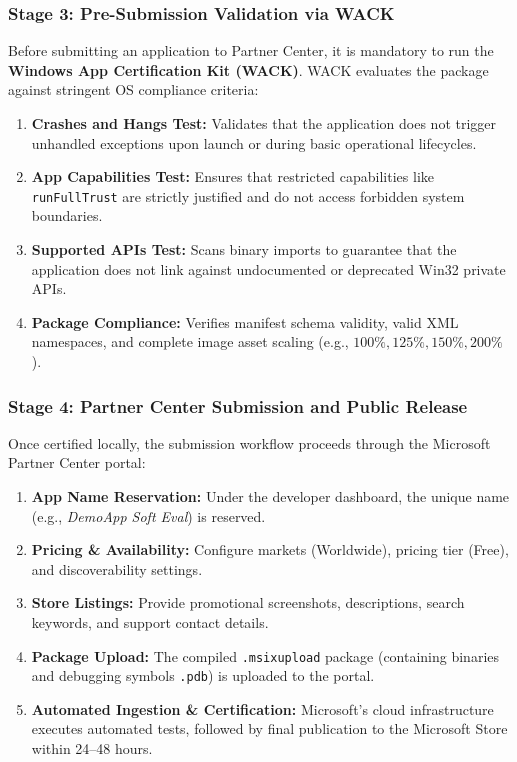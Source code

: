 \documentclass[11pt,a4paper]{article}
\begin{document}
\subsubsection{Stage 3: Pre-Submission Validation via WACK}
Before submitting an application to Partner Center, it is mandatory to run the \textbf{Windows App Certification Kit (WACK)}. WACK evaluates the package against stringent OS compliance criteria:
\begin{enumerate}[leftmargin=1.2cm]
    \item \textbf{Crashes and Hangs Test:} Validates that the application does not trigger unhandled exceptions upon launch or during basic operational lifecycles.
    \item \textbf{App Capabilities Test:} Ensures that restricted capabilities like \texttt{runFullTrust} are strictly justified and do not access forbidden system boundaries.
    \item \textbf{Supported APIs Test:} Scans binary imports to guarantee that the application does not link against undocumented or deprecated Win32 private APIs.
    \item \textbf{Package Compliance:} Verifies manifest schema validity, valid XML namespaces, and complete image asset scaling (e.g., $100\%, 125\%, 150\%, 200\%$).
\end{enumerate}

\subsubsection{Stage 4: Partner Center Submission and Public Release}
Once certified locally, the submission workflow proceeds through the Microsoft Partner Center portal:
\begin{enumerate}[leftmargin=1.2cm]
    \item \textbf{App Name Reservation:} Under the developer dashboard, the unique name (e.g., \textit{DemoApp Soft Eval}) is reserved.
    \item \textbf{Pricing \& Availability:} Configure markets (Worldwide), pricing tier (Free), and discoverability settings.
    \item \textbf{Store Listings:} Provide promotional screenshots, descriptions, search keywords, and support contact details.
    \item \textbf{Package Upload:} The compiled \texttt{.msixupload} package (containing binaries and debugging symbols \texttt{.pdb}) is uploaded to the portal.
    \item \textbf{Automated Ingestion \& Certification:} Microsoft's cloud infrastructure executes automated tests, followed by final publication to the Microsoft Store within 24--48 hours.
\end{enumerate}
\end{document}
